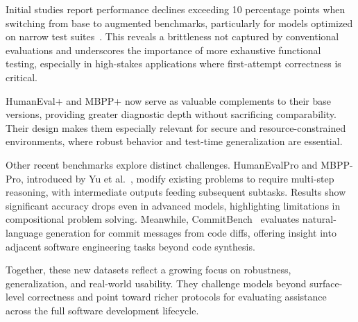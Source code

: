 Initial studies report performance declines exceeding 10 percentage points when switching from base to augmented benchmarks, particularly for models optimized on narrow test suites~\autocite{Liu2023Rigorous}. This reveals a brittleness not captured by conventional evaluations and underscores the importance of more exhaustive functional testing, especially in high-stakes applications where first-attempt correctness is critical.

HumanEval+ and MBPP+ now serve as valuable complements to their base versions, providing greater diagnostic depth without sacrificing comparability. Their design makes them especially relevant for secure and resource-constrained environments, where robust behavior and test-time generalization are essential.

Other recent benchmarks explore distinct challenges. HumanEvalPro and MBPP-Pro, introduced by Yu et al.~\autocite{yu2024humanevalpro}, modify existing problems to require multi-step reasoning, with intermediate outputs feeding subsequent subtasks. Results show significant accuracy drops even in advanced models, highlighting limitations in compositional problem solving. Meanwhile, CommitBench~\autocite{schall2024commitbench} evaluates natural-language generation for commit messages from code diffs, offering insight into adjacent software engineering tasks beyond code synthesis.

Together, these new datasets reflect a growing focus on robustness, generalization, and real-world usability. They challenge models beyond surface-level correctness and point toward richer protocols for evaluating assistance across the full software development lifecycle.



